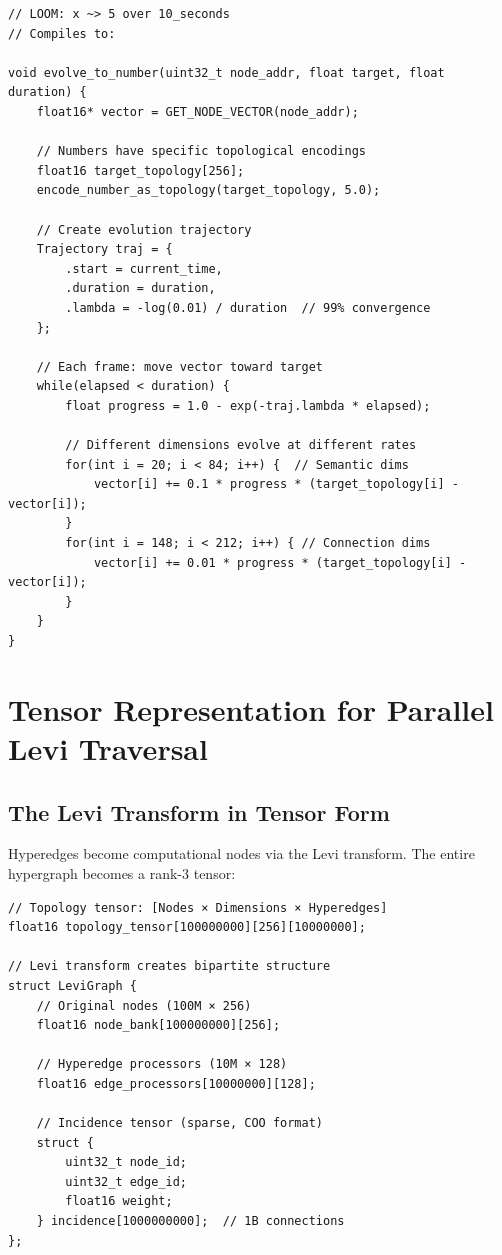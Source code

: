 \documentclass[12pt,a4paper,openany]{book} %
\begin{document}
\vspace{0.5em}
\begin{lstlisting}[style=cpp]
// LOOM: x ~> 5 over 10_seconds
// Compiles to:

void evolve_to_number(uint32_t node_addr, float target, float duration) {
    float16* vector = GET_NODE_VECTOR(node_addr);

    // Numbers have specific topological encodings
    float16 target_topology[256];
    encode_number_as_topology(target_topology, 5.0);

    // Create evolution trajectory
    Trajectory traj = {
        .start = current_time,
        .duration = duration,
        .lambda = -log(0.01) / duration  // 99% convergence
    };

    // Each frame: move vector toward target
    while(elapsed < duration) {
        float progress = 1.0 - exp(-traj.lambda * elapsed);

        // Different dimensions evolve at different rates
        for(int i = 20; i < 84; i++) {  // Semantic dims
            vector[i] += 0.1 * progress * (target_topology[i] - vector[i]);
        }
        for(int i = 148; i < 212; i++) { // Connection dims
            vector[i] += 0.01 * progress * (target_topology[i] - vector[i]);
        }
    }
}
\end{lstlisting}
\vspace{0.5em}

\section{Tensor Representation for Parallel Levi Traversal}

\subsection{The Levi Transform in Tensor Form}

Hyperedges become computational nodes via the Levi transform. The entire hypergraph becomes a rank-3 tensor:

\vspace{0.5em}
\begin{lstlisting}[style=cpp]
// Topology tensor: [Nodes × Dimensions × Hyperedges]
float16 topology_tensor[100000000][256][10000000];

// Levi transform creates bipartite structure
struct LeviGraph {
    // Original nodes (100M × 256)
    float16 node_bank[100000000][256];

    // Hyperedge processors (10M × 128)
    float16 edge_processors[10000000][128];

    // Incidence tensor (sparse, COO format)
    struct {
        uint32_t node_id;
        uint32_t edge_id;
        float16 weight;
    } incidence[1000000000];  // 1B connections
};
\end{lstlisting}
\vspace{0.5em}
\end{document}

